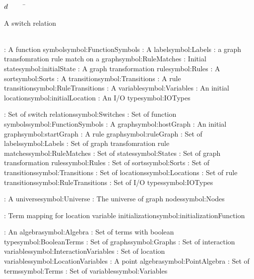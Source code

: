 \begin{tabbing}

$d$~~~~~\=\parbox{5in}{A switch relation\dotfill \pageref{symbol:Switches}}\\
\addsymbol \functionSymbol: {A function symbol}{symbol:FunctionSymbols}
\addsymbol \ltsLabel: {A label}{symbol:Labels}
\addsymbol {}: {a graph transfomration rule match on a graph}{symbol:RuleMatches}
\addsymbol \initialState: {Initial state}{symbol:initialState}
\addsymbol \ggrule: {A graph transformation rule}{symbol:Rules}
\addsymbol \sort: {A sort}{symbol:Sorts}
\addsymbol \transition: {A transition}{symbol:Transitions}
\addsymbol {}: {A rule transition}{symbol:RuleTransitions}
\addsymbol \variable: {A variable}{symbol:Variables}
\addsymbol \initialLocation: {An initial location}{symbol:initialLocation}
\addsymbol \iotype: {An I/O type}{symbol:IOTypes}

\addsymbol \Switches: {Set of switch relations}{symbol:Switches}
\addsymbol \FunctionSymbols: {Set of function symbols}{symbol:FunctionSymbols}
\addsymbol \hostGraph: {A graph}{symbol:hostGraph}
\addsymbol \startGraph: {An initial graph}{symbol:startGraph}
\addsymbol {}: {A rule graph}{symbol:ruleGraph}
\addsymbol \Labels: {Set of labels}{symbol:Labels}
\addsymbol \RuleMatches: {Set of graph transfomration rule matches}{symbol:RuleMatches}
\addsymbol \States: {Set of states}{symbol:States}
\addsymbol \Rules: {Set of graph transformation rules}{symbol:Rules}
\addsymbol \Sorts: {Set of sorts}{symbol:Sorts}
\addsymbol \Transitions: {Set of transitions}{symbol:Transitions}
\addsymbol \Locations: {Set of locations}{symbol:Locations}
\addsymbol \RuleTransitions: {Set of rule transitions}{symbol:RuleTransitions}
\addsymbol \IOTypes: {Set of I/O types}{symbol:IOTypes}

\addsymbol {}: {A universe}{symbol:Universe}
\addsymbol \Nodes: {The universe of graph nodes}{symbol:Nodes}

\addsymbol \initializationFunction: {Term mapping for location variable initialization}{symbol:initializationFunction}

\addsymbol \Algebra: {An algebra}{symbol:Algebra}
\addsymbol \BooleanTerms: {Set of terms with boolean type}{symbol:BooleanTerms}
\addsymbol \Graphs: {Set of graphs}{symbol:Graphs}
\addsymbol \InteractionVariables: {Set of interaction variables}{symbol:InteractionVariables}
\addsymbol \LocationVariables: {Set of location variables}{symbol:LocationVariables}
\addsymbol \PointAlgebra: {A point algebra}{symbol:PointAlgebra}
\addsymbol \Terms: {Set of terms}{symbol:Terms}
\addsymbol \Variables: {Set of variables}{symbol:Variables}


\end{tabbing}
